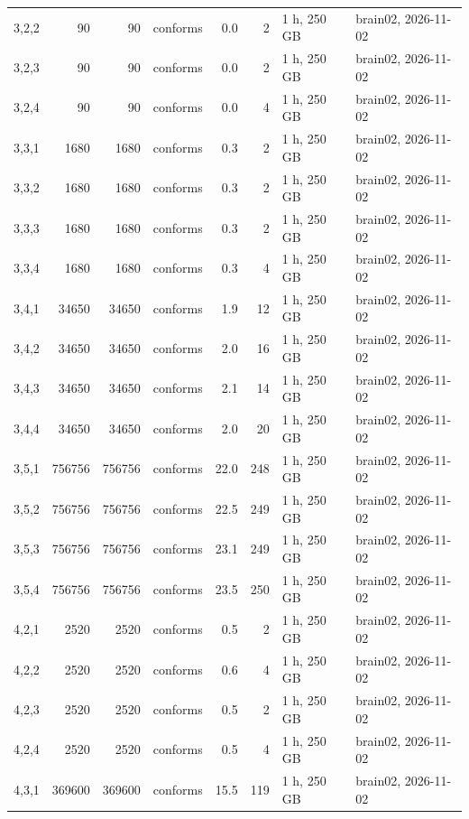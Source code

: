 \documentclass[10pt]{article}
\begin{document}
\begin{longtable}{@{}rrrlrrll@{}}
\color{blue} 3,2,2 & 90 & 90 & conforms & 0.0 & 2 & 1 h, 250 GB & brain02, 2026-11-02 \\
\color{blue} 3,2,3 & 90 & 90 & conforms & 0.0 & 2 & 1 h, 250 GB & brain02, 2026-11-02 \\
\color{blue} 3,2,4 & 90 & 90 & conforms & 0.0 & 4 & 1 h, 250 GB & brain02, 2026-11-02 \\
\color{blue} 3,3,1 & 1680 & 1680 & conforms & 0.3 & 2 & 1 h, 250 GB & brain02, 2026-11-02 \\
\color{blue} 3,3,2 & 1680 & 1680 & conforms & 0.3 & 2 & 1 h, 250 GB & brain02, 2026-11-02 \\
\color{blue} 3,3,3 & 1680 & 1680 & conforms & 0.3 & 2 & 1 h, 250 GB & brain02, 2026-11-02 \\
\color{blue} 3,3,4 & 1680 & 1680 & conforms & 0.3 & 4 & 1 h, 250 GB & brain02, 2026-11-02 \\
\color{blue} 3,4,1 & 34650 & 34650 & conforms & 1.9 & 12 & 1 h, 250 GB & brain02, 2026-11-02 \\
\color{blue} 3,4,2 & 34650 & 34650 & conforms & 2.0 & 16 & 1 h, 250 GB & brain02, 2026-11-02 \\
\color{blue} 3,4,3 & 34650 & 34650 & conforms & 2.1 & 14 & 1 h, 250 GB & brain02, 2026-11-02 \\
\color{blue} 3,4,4 & 34650 & 34650 & conforms & 2.0 & 20 & 1 h, 250 GB & brain02, 2026-11-02 \\
\color{blue} 3,5,1 & 756756 & 756756 & conforms & 22.0 & 248 & 1 h, 250 GB & brain02, 2026-11-02 \\
\color{blue} 3,5,2 & 756756 & 756756 & conforms & 22.5 & 249 & 1 h, 250 GB & brain02, 2026-11-02 \\
\color{blue} 3,5,3 & 756756 & 756756 & conforms & 23.1 & 249 & 1 h, 250 GB & brain02, 2026-11-02 \\
\color{blue} 3,5,4 & 756756 & 756756 & conforms & 23.5 & 250 & 1 h, 250 GB & brain02, 2026-11-02 \\
\color{blue} 4,2,1 & 2520 & 2520 & conforms & 0.5 & 2 & 1 h, 250 GB & brain02, 2026-11-02 \\
\color{blue} 4,2,2 & 2520 & 2520 & conforms & 0.6 & 4 & 1 h, 250 GB & brain02, 2026-11-02 \\
\color{blue} 4,2,3 & 2520 & 2520 & conforms & 0.5 & 2 & 1 h, 250 GB & brain02, 2026-11-02 \\
\color{blue} 4,2,4 & 2520 & 2520 & conforms & 0.5 & 4 & 1 h, 250 GB & brain02, 2026-11-02 \\
\color{blue} 4,3,1 & 369600 & 369600 & conforms & 15.5 & 119 & 1 h, 250 GB & brain02, 2026-11-02 \\

\end{longtable}
\end{document}
